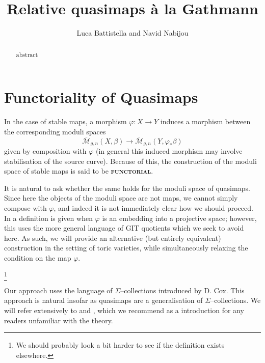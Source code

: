 \documentclass[11pt]{amsart}
\title{Relative quasimaps \`a la Gathmann}
\author{Luca Battistella and Navid Nabijou}
\newcommand{\M}[4]{\overline{\mathcal M}_{#1,#2}(#3,#4)}
\renewcommand{\to}{\rightarrow}
\newcommand{\ildef}[1]{\textbf{\textsc{#1}}}
\theoremstyle{plain}
\theoremstyle{definition}
\begin{document}
\maketitle
\begin{abstract}
abstract
\end{abstract}

\newpage

\section{Functoriality of Quasimaps}

In the case of stable maps, a morphism $\varphi : X \to Y$ induces a morphism between the corresponding moduli spaces
\begin{equation*}\M{g}{n}{X}{\beta} \rightarrow \M{g}{n}{Y}{\varphi_* \beta} \end{equation*}
given by composition with $\varphi$ (in general this induced morphism may involve stabilisation of the source curve). Because of this, the construction of the moduli space of stable maps is said to be \ildef{functorial}.

It is natural to ask whether the same holds for the moduli space of quasimaps. Since here the objects of the moduli space are not maps, we cannot simply compose with $\varphi$, and indeed it is not immediately clear how we should proceed. In \cite[Section 3.1]{CF-K-wallcrossing} a definition is given when $\varphi$ is an embedding into a projective space; however, this uses the more general language of GIT quotients which we seek to avoid here. As such, we will provide an alternative (but entirely equivalent) construction in the setting of toric varieties, while simultaneously relaxing the condition on the map $\varphi$.

\footnote{We should probably look a bit harder to see if the definition exists elsewhere.}

Our approach uses the language of $\Sigma$--collections introduced by D. Cox. This approach is natural insofar as quasimaps are a generalisation of $\Sigma$--collections. We will refer extensively to \cite{CoxRing} and \cite{CoxFunctor}, which we recommend as a  introduction for any readers unfamiliar with the theory.
\end{document}
